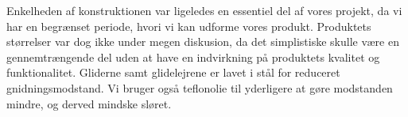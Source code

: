 Enkelheden af konstruktionen var ligeledes en essentiel del af vores
projekt, da vi har en begrænset periode, hvori vi kan udforme vores
produkt. Produktets størrelser var dog ikke under megen diskusion, da
det simplistiske skulle være en gennemtrængende del uden at have en
indvirkning på produktets kvalitet og funktionalitet. Gliderne samt
glidelejrene er lavet i stål for reduceret gnidningsmodstand. Vi
bruger også teflonolie til yderligere at gøre modstanden mindre, og
derved mindske sløret.


